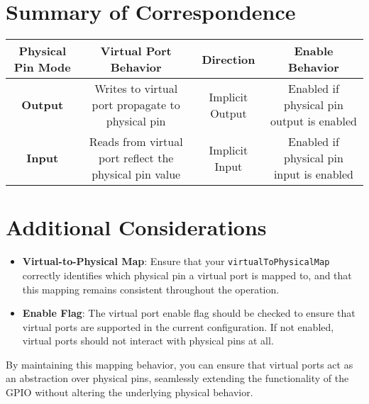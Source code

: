 \section*{Summary of Correspondence}

\begin{table}[ht]
    \centering
    \begin{tabular}{|c|c|c|c|}
        \hline
        \textbf{Physical Pin Mode} & \textbf{Virtual Port Behavior} & \textbf{Direction} & \textbf{Enable Behavior} \\
        \hline
        \textbf{Output} & Writes to virtual port propagate to physical pin & Implicit Output & Enabled if physical pin output is enabled \\
        \hline
        \textbf{Input} & Reads from virtual port reflect the physical pin value & Implicit Input & Enabled if physical pin input is enabled \\
        \hline
    \end{tabular}
\end{table}

\section*{Additional Considerations}
\begin{itemize}
    \item \textbf{Virtual-to-Physical Map}: Ensure that your \texttt{virtualToPhysicalMap} correctly identifies which physical pin a virtual port is mapped to, and that this mapping remains consistent throughout the operation.
    \item \textbf{Enable Flag}: The virtual port enable flag should be checked to ensure that virtual ports are supported in the current configuration. If not enabled, virtual ports should not interact with physical pins at all.
\end{itemize}

By maintaining this mapping behavior, you can ensure that virtual ports act as an abstraction over physical pins, seamlessly extending the functionality of the GPIO without altering the underlying physical behavior.
